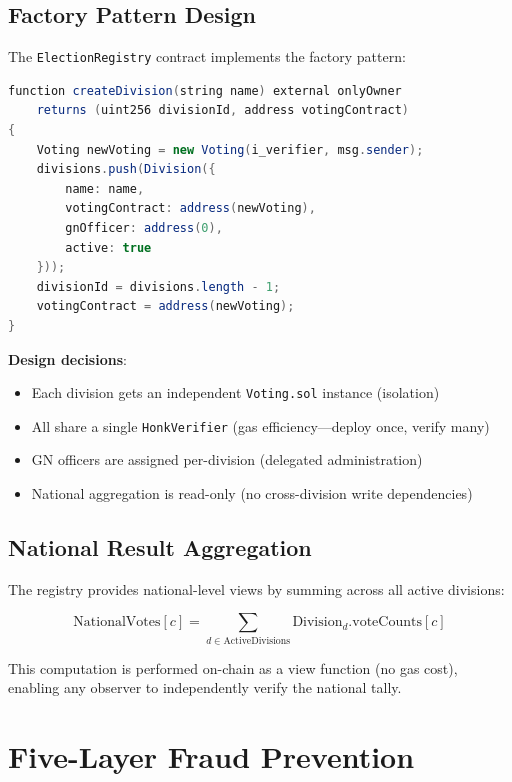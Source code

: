 \subsection{Factory Pattern Design}

The \texttt{ElectionRegistry} contract implements the factory pattern:

\begin{lstlisting}[language=Java, caption={ElectionRegistry factory pattern (simplified).}]
function createDivision(string name) external onlyOwner
    returns (uint256 divisionId, address votingContract)
{
    Voting newVoting = new Voting(i_verifier, msg.sender);
    divisions.push(Division({
        name: name,
        votingContract: address(newVoting),
        gnOfficer: address(0),
        active: true
    }));
    divisionId = divisions.length - 1;
    votingContract = address(newVoting);
}
\end{lstlisting}

\textbf{Design decisions}:
\begin{itemize}
    \item Each division gets an independent \texttt{Voting.sol} instance (isolation)
    \item All share a single \texttt{HonkVerifier} (gas efficiency---deploy once, verify many)
    \item GN officers are assigned per-division (delegated administration)
    \item National aggregation is read-only (no cross-division write dependencies)
\end{itemize}

\subsection{National Result Aggregation}

The registry provides national-level views by summing across all active divisions:

\begin{equation}
\text{NationalVotes}[c] = \sum_{d \in \text{ActiveDivisions}} \text{Division}_d.\text{voteCounts}[c]
\label{eq:national-agg}
\end{equation}

This computation is performed on-chain as a view function (no gas cost), enabling any observer to independently verify the national tally.

\section{Five-Layer Fraud Prevention}

